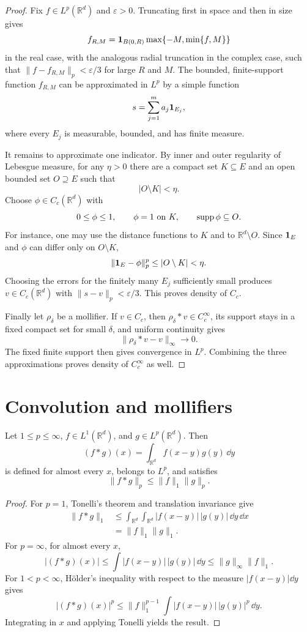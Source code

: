 \begin{proof}
Fix $f\in L^p(\mathbb R^d)$ and $\varepsilon>0$.  Truncating first in space and
then in size gives
\[
  f_{R,M}=\mathbf{1}_{B(0,R)}\max\{-M,\min\{f,M\}\}
\]
in the real case, with the analogous radial truncation in the complex case,
such that $\|f-f_{R,M}\|_p<\varepsilon/3$ for large $R$ and $M$.  The bounded,
finite-support function $f_{R,M}$ can be approximated in $L^p$ by a simple
function
\[
  s=\sum_{j=1}^m a_j\mathbf{1}_{E_j},
\]
where every $E_j$ is measurable, bounded, and has finite measure.

It remains to approximate one indicator.  By inner and outer regularity of
Lebesgue measure, for any $\eta>0$ there are a compact set $K\subseteq E$ and
an open bounded set $O\supseteq E$ such that
\[
  |O\setminus K|<\eta.
\]
Choose $\phi\in C_c(\mathbb R^d)$ with
\[
  0\le\phi\le1,
  \qquad \phi=1\text{ on }K,
  \qquad \operatorname{supp}\phi\subseteq O.
\]
For instance, one may use the distance functions to $K$ and to
$\mathbb R^d\setminus O$.  Since $\mathbf{1}_E$ and $\phi$ can differ only on
$O\setminus K$,
\[
  \|\mathbf{1}_E-\phi\|_p^p\le |O\setminus K|<\eta.
\]
Choosing the errors for the finitely many $E_j$ sufficiently small produces
$v\in C_c(\mathbb R^d)$ with $\|s-v\|_p<\varepsilon/3$.  This proves density
of $C_c$.

Finally let $\rho_\delta$ be a mollifier.  If $v\in C_c$, then
$\rho_\delta*v\in C_c^\infty$, its support stays in a fixed compact set for
small $\delta$, and uniform continuity gives
\[
  \|\rho_\delta*v-v\|_\infty\longrightarrow0.
\]
The fixed finite support then gives convergence in $L^p$.  Combining the three
approximations proves density of $C_c^\infty$ as well.
\end{proof}

\section{Convolution and mollifiers}

\begin{notetheorem}
Let $1\le p\le\infty$, $f\in L^1(\mathbb R^d)$, and
$g\in L^p(\mathbb R^d)$.  Then
\[
  (f*g)(x)=\int_{\mathbb R^d}f(x-y)g(y)\,\dd y
\]
is defined for almost every $x$, belongs to $L^p$, and satisfies
\[
  \|f*g\|_p\le\|f\|_1\|g\|_p.
\]
\end{notetheorem}

\begin{proof}
For $p=1$, Tonelli's theorem and translation invariance give
\[
\begin{aligned}
  \|f*g\|_1
  &\le\int_{\mathbb R^d}\int_{\mathbb R^d}
       |f(x-y)|\,|g(y)|\,\dd y\,\dd x\\
  &=\|f\|_1\|g\|_1.
\end{aligned}
\]
For $p=\infty$, for almost every $x$,
\[
  |(f*g)(x)|
  \le\int |f(x-y)|\,|g(y)|\,\dd y
  \le\|g\|_\infty\|f\|_1.
\]
For $1<p<\infty$, Hölder's inequality with respect to the measure
$|f(x-y)|\dd y$ gives
\[
 |(f*g)(x)|^p
 \le \|f\|_1^{p-1}
     \int |f(x-y)|\,|g(y)|^p\,\dd y.
\]
Integrating in $x$ and applying Tonelli yields the result.
\end{proof}

